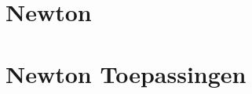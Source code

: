 \documentclass{ximera}
\begin{document}
        \author{Bert Lambregs}

\section{Newton}


% 


\section{Newton Toepassingen}






\end{document}
